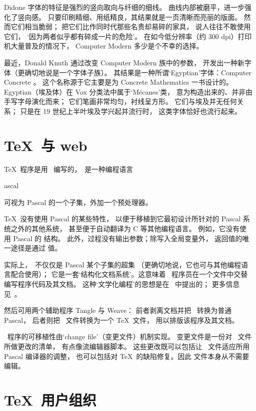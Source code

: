 \documentclass[a4paper]{rapport3}
\def\term#1\par{\index{#1}}
\begin{document}
Didone 字体的特征是强烈的竖向取向与纤细的细线。
曲线内部被磨平，进一步强化了竖向感。
只要印刷精细、用纸精良，其结果就是一页清晰而亮丽的版面。
然而它们相当脆弱；\cite{Up}
把它们比作同时代那些名贵却易碎的家具，
说人往往不敢使用它们，
`因为两者似乎都有碎成一片的危险'。
在如今低分辨率（约 300 dpi）打印机大量普及的情况下，
Computer Modern 多少是个不幸的选择。

最近，Donald Knuth 通过改变 Computer Modern 族中的参数，
开发出一种新字体（更确切地说是一个字体子族）。
其结果是一种所谓`Egyptian'字体：Computer Concrete \cite{K:cc}。
这个名称源于它主要是为 {\italic Concrete Mathematics} 一书设计的。
Egyptian（埃及体）在 Vox 分类法中属于`M\'ecanes'类，
意为构造出来的、并非由手写字母演化而来；
它们笔画非常均匀，衬线呈方形。
它们与埃及并无任何关系；
只是在 19 世纪上半叶埃及学兴起并流行时，
这类字体恰好也流行起来。

\section{\TeX\ 与 web}

\TeX\ 程序是用 \web\ 编写的，\web\ 是一种编程语言
\term \web\par\term Pascal\par
可视为 Pascal 的一个子集，外加一个预处理器。

\TeX\ 没有使用 Pascal 的某些特性，
以便于移植到它最初设计所针对的 Pascal 系统之外的其他系统，
甚至便于自动翻译为 C 等其他编程语言。
例如，它没有使用 Pascal 的  结构。
此外，过程没有输出参数；除写入全局变量外，
返回值的唯一途径是通过  值。

实际上，\web\ 不仅仅是 Pascal 某个子集的超集
（更确切地说，它也可与其他编程语言配合使用）；
它是一套`结构化文档系统'。这意味着
\web\ 程序员在一个文件中交替编写程序代码及其文档。
这种`文学化编程'的思想是在~\cite{K:literate} 中提出的；
更多信息见~\cite{Sewell}。

然后可用两个辅助程序 Tangle 与 Weave：
前者剥离文档并把 \web\ 转换为普通 Pascal，
后者则把 \web\ 文件转换为一个 \TeX\ 文件，
用以排版该程序及其文档。

\web\ 程序的可移植性由`change file'（变更文件）机制实现。
变更文件是一份对 \web\ 文件所做更改的清单，
有点像流编辑器脚本。
这些更改既可以包括让 \web\ 文件适应所用 Pascal 编译器的调整，
也可以包括对 \TeX\ 的缺陷修复。因此  文件本身从不需要编辑。


\section{\TeX\ 用户组织}
\end{document}
